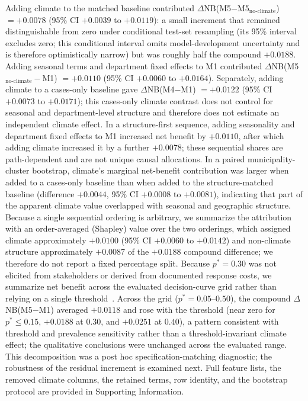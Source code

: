 \documentclass[11pt,a4paper]{article}
\begin{document}
Adding climate to the matched baseline contributed $\Delta$NB(M5$-$M5$_{\text{no-climate}}$) $=+0.0078$ (95\% CI $+0.0039$ to $+0.0119$): a small increment that remained distinguishable from zero under conditional test-set resampling (its 95\% interval excludes zero; this conditional interval omits model-development uncertainty and is therefore optimistically narrow) but was roughly half the compound $+0.0188$. Adding seasonal terms and department fixed effects to M1 contributed $\Delta$NB(M5$_{\text{no-climate}}-$M1) $=+0.0110$ (95\% CI $+0.0060$ to $+0.0164$). Separately, adding climate to a cases-only baseline gave $\Delta$NB(M4$-$M1) $=+0.0122$ (95\% CI $+0.0073$ to $+0.0171$); this cases-only climate contrast does not control for seasonal and department-level structure and therefore does not estimate an independent climate effect. In a structure-first sequence, adding seasonality and department fixed effects to M1 increased net benefit by $+0.0110$, after which adding climate increased it by a further $+0.0078$; these sequential shares are path-dependent and are not unique causal allocations. In a paired municipality-cluster bootstrap, climate's marginal net-benefit contribution was larger when added to a cases-only baseline than when added to the structure-matched baseline (difference $+0.0044$, 95\% CI $+0.0008$ to $+0.0081$), indicating that part of the apparent climate value overlapped with seasonal and geographic structure. Because a single sequential ordering is arbitrary, we summarize the attribution with an order-averaged (Shapley) value over the two orderings, which assigned climate approximately $+0.0100$ (95\% CI $+0.0060$ to $+0.0142$) and non-climate structure approximately $+0.0087$ of the $+0.0188$ compound difference; we therefore do not report a fixed percentage split. Because $p^*=0.30$ was not elicited from stakeholders or derived from documented response costs, we summarize net benefit across the evaluated decision-curve grid rather than relying on a single threshold~\cite{VanCalster2019,Vickers2016}. Across the grid ($p^*=0.05$--$0.50$), the compound $\Delta$NB(M5$-$M1) averaged $+0.0118$ and rose with the threshold (near zero for $p^*\le0.15$, $+0.0188$ at $0.30$, and $+0.0251$ at $0.40$), a pattern consistent with threshold and prevalence sensitivity rather than a threshold-invariant climate effect; the qualitative conclusions were unchanged across the evaluated range. This decomposition was a post hoc specification-matching diagnostic; the robustness of the residual increment is examined next. Full feature lists, the removed climate columns, the retained terms, row identity, and the bootstrap protocol are provided in Supporting Information.
\end{document}
